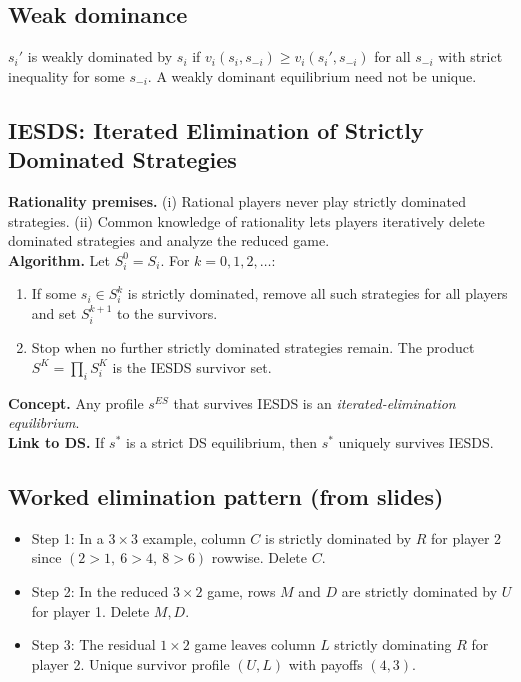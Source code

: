 \documentclass[9pt]{article}
\begin{document}
\subsection*{Weak dominance}
$s_i'$ is weakly dominated by $s_i$ if $v_i(s_i,s_{-i})\ge v_i(s_i',s_{-i})$ for all $s_{-i}$ with strict inequality for some $s_{-i}$. A weakly dominant equilibrium need not be unique.

\subsection*{IESDS: Iterated Elimination of Strictly Dominated Strategies}
\textbf{Rationality premises.} (i) Rational players never play strictly dominated strategies. (ii) Common knowledge of rationality lets players iteratively delete dominated strategies and analyze the reduced game.\\[2pt]
\textbf{Algorithm.} Let $S_i^0=S_i$. For $k=0,1,2,\dots$:
\begin{enumerate}[label=\arabic*)]
\item If some $s_i\in S_i^k$ is strictly dominated, remove all such strategies for all players and set $S_i^{k+1}$ to the survivors.
\item Stop when no further strictly dominated strategies remain. The product $S^K=\prod_i S_i^K$ is the IESDS survivor set.
\end{enumerate}
\textbf{Concept.} Any profile $s^{ES}$ that survives IESDS is an \emph{iterated-elimination equilibrium}.\\
\textbf{Link to DS.} If $s^*$ is a strict DS equilibrium, then $s^*$ uniquely survives IESDS.

\subsection*{Worked elimination pattern (from slides)}
\begin{itemize}
\item Step 1: In a $3\times3$ example, column $C$ is strictly dominated by $R$ for player 2 since $(2>1,\ 6>4,\ 8>6)$ rowwise. Delete $C$.
\item Step 2: In the reduced $3\times2$ game, rows $M$ and $D$ are strictly dominated by $U$ for player 1. Delete $M,D$.
\item Step 3: The residual $1\times2$ game leaves column $L$ strictly dominating $R$ for player 2. Unique survivor profile $(U,L)$ with payoffs $(4,3)$.
\end{itemize}
\end{document}
